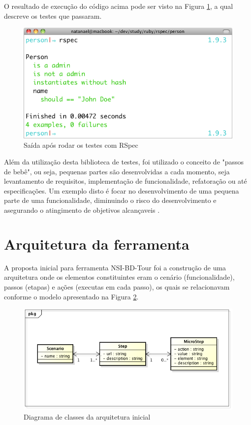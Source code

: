 O resultado de execução do código acima pode ser visto na Figura \ref{figura_31}, a qual descreve os testes que passaram.

\begin{figure}[ht]
    \centering
    \includegraphics[width=0.9 \textwidth]{figuras/figura_31}
    \caption{Saída após rodar os testes com RSpec}
    \label{figura_31}
\end{figure}

Além da utilização desta biblioteca de testes, foi utilizado o conceito de "passos de bebê", ou seja, pequenas partes são desenvolvidas a cada momento, seja levantamento de requisitos, implementação de funcionalidade, refatoração ou até especificações. Um exemplo disto é focar no desenvolvimento de uma pequena parte de uma funcionalidade, diminuindo o risco do desenvolvimento e asegurando o atingimento de objetivos alcançaveis \cite{RODRIGO}.















\section{Arquitetura da ferramenta}

A proposta inicial para ferramenta NSI-BD-Tour foi a construção de uma arquitetura onde os elementos constituintes eram o cenário (funcionalidade), passos (etapas) e ações (executas em cada passo), os quais se relacionavam conforme o modelo apresentado na Figura \ref{figura_32}.

\begin{figure}[ht]
    \centering
    \includegraphics[width=0.5 \textwidth]{figuras/figura_32}
    \caption{Diagrama de classes da arquitetura inicial}
    \label{figura_32}
\end{figure}

